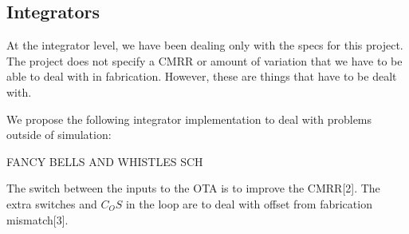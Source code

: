 \documentclass[conference]{IEEEtran}
\begin{document}
\subsection{Integrators}
At the integrator level, we have been dealing only with the specs for this project. The project does not specify a CMRR or amount of variation that we have to be able to deal with in fabrication. However, these are things that have to be dealt with.

We propose the following integrator implementation to deal with problems outside of simulation:

FANCY BELLS AND WHISTLES SCH

The switch between the inputs to the OTA is to improve the CMRR[2]. The extra switches and $C_OS$ in the loop are to deal with offset from fabrication mismatch[3]. 







%
%

\end{document}
